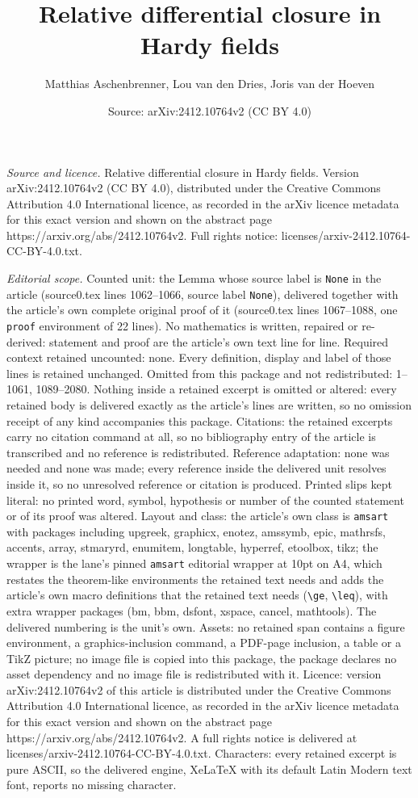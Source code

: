 \documentclass[10pt,a4paper]{amsart}
\title[Relative differential closure in Hardy fields]{Relative differential closure in Hardy fields}
\author{Matthias Aschenbrenner, Lou van den Dries, Joris van der Hoeven}
\date{Source: arXiv:2412.10764v2 (CC BY 4.0)}
\begin{document}
\maketitle

\noindent\emph{Source and licence.} Relative differential closure in Hardy fields. Version arXiv:2412.10764v2 (CC BY 4.0), distributed under the Creative Commons Attribution 4.0 International licence, as recorded in the arXiv licence metadata for this exact version and shown on the abstract page https://arxiv.org/abs/2412.10764v2. Full rights notice: licenses/arxiv-2412.10764-CC-BY-4.0.txt.\par\smallskip

\noindent\textit{Editorial scope.} Counted unit: the Lemma whose source label is \texttt{None} in the article (source0.tex lines 1062--1066, source label \texttt{None}), delivered together with the article's own complete original proof of it (source0.tex lines 1067--1088, one \texttt{proof} environment of 22 lines). No mathematics is written, repaired or re-derived: statement and proof are the article's own text line for line. Required context retained uncounted: none. Every definition, display and label of those lines is retained unchanged. Omitted from this package and not redistributed: 1--1061, 1089--2080. Nothing inside a retained excerpt is omitted or altered: every retained body is delivered exactly as the article's lines are written, so no omission receipt of any kind accompanies this package. Citations: the retained excerpts carry no citation command at all, so no bibliography entry of the article is transcribed and no reference is redistributed. Reference adaptation: none was needed and none was made; every reference inside the delivered unit resolves inside it, so no unresolved reference or citation is produced. Printed slips kept literal: no printed word, symbol, hypothesis or number of the counted statement or of its proof was altered. Layout and class: the article's own class is \texttt{amsart} with packages including upgreek, graphicx, enotez, amssymb, epic, mathrsfs, accents, array, stmaryrd, enumitem, longtable, hyperref, etoolbox, tikz; the wrapper is the lane's pinned \texttt{amsart} editorial wrapper at 10pt on A4, which restates the theorem-like environments the retained text needs and adds the article's own macro definitions that the retained text needs (\texttt{\textbackslash ge}, \texttt{\textbackslash leq}), with extra wrapper packages (bm, bbm, dsfont, xspace, cancel, mathtools). The delivered numbering is the unit's own. Assets: no retained span contains a figure environment, a graphics-inclusion command, a PDF-page inclusion, a table or a TikZ picture; no image file is copied into this package, the package declares no asset dependency and no image file is redistributed with it. Licence: version arXiv:2412.10764v2 of this article is distributed under the Creative Commons Attribution 4.0 International licence, as recorded in the arXiv licence metadata for this exact version and shown on the abstract page https://arxiv.org/abs/2412.10764v2. A full rights notice is delivered at licenses/arxiv-2412.10764-CC-BY-4.0.txt. Characters: every retained excerpt is pure ASCII, so the delivered engine, XeLaTeX with its default Latin Modern text font, reports no missing character.
\end{document}
